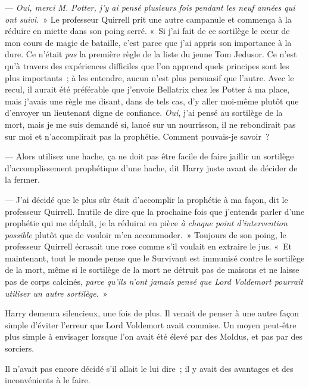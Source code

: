 --- \emph{Oui, merci M. Potter, j'y ai pensé plusieurs fois pendant les neuf années qui ont suivi.}~» Le professeur Quirrell prit une autre campanule et commença à la réduire en miette dans son poing serré.
«~Si j'ai fait de ce sortilège le cœur de mon cours de magie de bataille, c'est parce que j'ai appris son importance à la dure.
Ce n'était \emph{pas} la première règle de la liste du jeune Tom Jedusor.
Ce n'est qu'à travers des expériences difficiles que l'on apprend quels principes sont les plus importants~; à les entendre, aucun n'est plus persuasif que l'autre.
Avec le recul, il aurait été préférable que j'envoie Bellatrix chez les Potter à ma place, mais j'avais une règle me disant, dans de tels cas, d'y aller moi-même plutôt que d'envoyer un lieutenant digne de confiance.
\emph{Oui}, j'ai pensé au sortilège de la mort, mais je me suis demandé si, lancé sur un nourrisson, il ne rebondirait pas sur moi et n'accomplirait pas la prophétie.
Comment pouvais-je savoir~?

--- Alors utilisez une hache, ça ne doit pas être facile de faire jaillir un sortilège d'accomplissement prophétique d'une hache, dit Harry juste avant de décider de la fermer.

--- J'ai décidé que le plus sûr était d'accomplir la prophétie à ma façon, dit le professeur Quirrell.
Inutile de dire que la prochaine fois que j'entends parler d'une prophétie qui me déplaît, je la réduirai en pièce \emph{à chaque point d'intervention possible} plutôt que de vouloir m'en accommoder.~»
Toujours de son poing, le professeur Quirrell écrasait une rose comme s'il voulait en extraire le jus.
«~Et maintenant, tout le monde pense que le Survivant est immunisé contre le sortilège de la mort, même si le sortilège de la mort ne détruit pas de maisons et ne laisse pas de corps calcinés, \emph{parce qu'ils n'ont jamais pensé que Lord Voldemort pourrait utiliser un autre sortilège}.~»

Harry demeura silencieux, une fois de plus.
Il venait de penser à une autre façon simple d'éviter l'erreur que Lord Voldemort avait commise.
Un moyen peut-être plus simple à envisager lorsque l'on avait été élevé par des Moldus, et pas par des sorciers.

Il n'avait pas encore décidé s'il allait le lui dire~; il y avait des avantages et des inconvénients à le faire.

